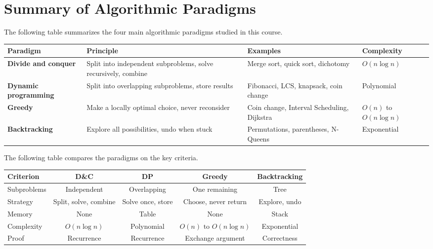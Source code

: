 \documentclass[11pt,a4paper]{article}
\begin{document}
\section{Summary of Algorithmic Paradigms}

The following table summarizes the four main algorithmic paradigms studied in this course.

\begin{center}
\renewcommand{\arraystretch}{1.3}
\small
\begin{tabular}{>{\raggedright\arraybackslash}p{2.5cm} >{\raggedright\arraybackslash}p{5cm} >{\raggedright\arraybackslash}p{4.5cm} >{\raggedright\arraybackslash}p{2.5cm}}
\toprule
Paradigm & Principle & Examples & Complexity \\
\midrule
\textbf{Divide and conquer} & Split into independent subproblems, solve recursively, combine & Merge sort, quick sort, dichotomy & $O(n \log n)$ \\
\textbf{Dynamic programming} & Split into overlapping subproblems, store results & Fibonacci, LCS, knapsack, coin change & Polynomial \\
\textbf{Greedy} & Make a locally optimal choice, never reconsider & Coin change, Interval Scheduling, Dijkstra & $O(n)$ to $O(n \log n)$ \\
\textbf{Backtracking} & Explore all possibilities, undo when stuck & Permutations, parentheses, N-Queens & Exponential \\
\bottomrule
\end{tabular}
\end{center}

\vspace{0.3cm}

The following table compares the paradigms on the key criteria.

\begin{center}
\renewcommand{\arraystretch}{1.3}
\small
\begin{tabular}{lcccc}
\toprule
Criterion & D\&C & DP & Greedy & Backtracking \\
\midrule
Subproblems & Independent & Overlapping & One remaining & Tree \\
Strategy & Split, solve, combine & Solve once, store & Choose, never return & Explore, undo \\
Memory & None & Table & None & Stack \\
Complexity & $O(n \log n)$ & Polynomial & $O(n) \text{ to } O(n \log n)$ & Exponential \\
Proof & Recurrence & Recurrence & Exchange argument & Correctness \\
\bottomrule
\end{tabular}
\end{center}
\end{document}
